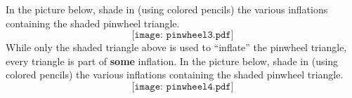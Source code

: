 \documentclass[noauthor,nooutcomes,handout,hints,12pt]{ximera}
\begin{document}
\mynewpage

\begin{question}
In the picture below, shade in (using colored pencils) the
various inflations containing the shaded pinwheel triangle.
\[
\texttt{[image: pinwheel3.pdf]}
\]
While only the shaded triangle above is used to ``inflate'' the
pinwheel triangle, every triangle is part of \textbf{some}
inflation. In the picture below, shade in (using colored pencils) the
various inflations containing the shaded pinwheel triangle.
\[
\texttt{[image: pinwheel4.pdf]}
\]
\end{question}








\end{document}
